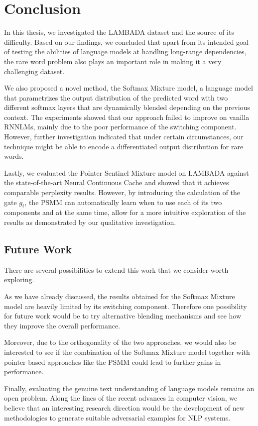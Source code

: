 \chapter{Conclusion}

In this thesis, we investigated the LAMBADA dataset and the source of its difficulty. Based on our findings, we concluded that apart from its intended goal of testing the abilities of language models at handling long-range dependencies, the rare word problem also plays an important role in making it a very challenging dataset.

We also proposed a novel method, the Softmax Mixture model, a language model that parametrizes the output distribution of the predicted word with two different softmax layers that are dynamically blended depending on the previous context. The experiments showed that our approach failed to improve on vanilla RNNLMs, mainly due to the poor performance of the switching component. However, further investigation indicated that under certain circumstances, our technique might be able to encode a differentiated output distribution for rare words.

Lastly, we evaluated the Pointer Sentinel Mixture model on LAMBADA against the state-of-the-art Neural Continuous Cache and showed that it achieves comparable perplexity results. However, by introducing the calculation of the gate $g_t$, the PSMM can automatically learn when to use each of its two components and at the same time, allow for a more intuitive exploration of the results as demonstrated by our qualitative investigation.

\section{Future Work}
\label{sec:futureWork}

There are several possibilities to extend this work that we consider worth exploring.

As we have already discussed, the results obtained for the Softmax Mixture model are heavily limited by its switching component. Therefore one possibility for future work would be to try alternative blending mechanisms and see how they improve the overall performance.

Moreover, due to the orthogonality of the two approaches, we would also be interested to see if the combination of the Softmax Mixture model together with pointer based approaches like the PSMM could lead to further gains in performance.

Finally, evaluating the genuine text understanding of language models remains an open problem. Along the lines of the recent advances in computer vision, we believe that an interesting research direction would be the development of new methodologies to generate suitable adversarial examples for NLP systems.

